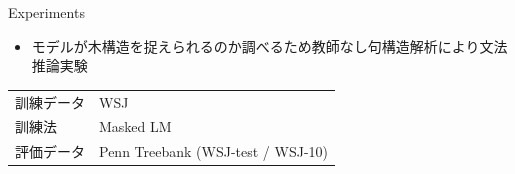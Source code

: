 \documentclass[unicode, 12pt, aspectratio=43]{beamer}
\begin{document}
\begin{frame}[label={sec:org5344bc8}]{Experiments}
\begin{itemize}
\item モデルが木構造を捉えられるのか調べるため教師なし句構造解析により文法推論実験
\end{itemize}

\begin{center}
\begin{tabular}{ll}
\toprule
訓練データ & WSJ\\
訓練法 & Masked LM\\
評価データ & Penn Treebank (WSJ-test / WSJ-10)\\
\bottomrule
\end{tabular}
\end{center}
\end{frame}
\end{document}
